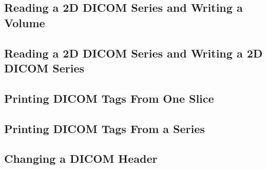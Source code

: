 \subsection{Reading a 2D DICOM Series and Writing a Volume}
\label{DicomSeriesReadImageWrite2}


\subsection{Reading a 2D DICOM Series and Writing a 2D DICOM Series}
\label{DicomSeriesReadSeriesWrite}


\subsection{Printing DICOM Tags From One Slice}
\label{DicomImageReadPrintTags}


\subsection{Printing DICOM Tags From a Series}
\label{DicomSeriesReadPrintTags}


\subsection{Changing a DICOM Header}
\label{DicomImageReadChangeHeaderWrite}

